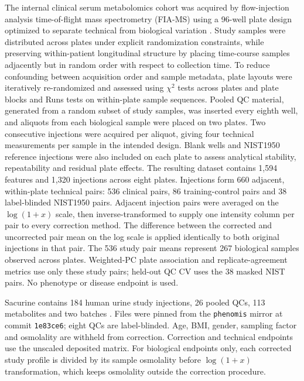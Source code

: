 \documentclass[namedate,webpdf,modern,large,nocrop]{oup-authoring-template}
\begin{document}
The internal clinical serum metabolomics cohort was acquired by flow-injection analysis time-of-flight mass spectrometry (FIA-MS) using a 96-well plate design optimized to separate technical from biological variation \citep{Fuhrer2011FIATOF}. Study samples were distributed across plates under explicit randomization constraints, while preserving within-patient longitudinal structure by placing time-course samples adjacently but in random order with respect to collection time. To reduce confounding between acquisition order and sample metadata, plate layouts were iteratively re-randomized and assessed using $\chi^2$ tests across plates and plate blocks and Runs tests on within-plate sample sequences. Pooled QC material, generated from a random subset of study samples, was inserted every eighth well, and aliquots from each biological sample were placed on two plates. Two consecutive injections were acquired per aliquot, giving four technical measurements per sample in the intended design. Blank wells and NIST1950 reference injections were also included on each plate to assess analytical stability, repeatability and residual plate effects. The resulting dataset contains 1,594 features and 1,320 injections across eight plates. Injections form 660 adjacent, within-plate technical pairs: 536 clinical pairs, 86 training-control pairs and 38 label-blinded NIST1950 pairs. Adjacent injection pairs were averaged on the \(\log(1+x)\) scale, then inverse-transformed to supply one intensity column per pair to every correction method. The difference between the corrected and uncorrected pair mean on the log scale is applied identically to both original injections in that pair. The 536 study pair means represent 267 biological samples observed across plates. Weighted-PC plate association and replicate-agreement metrics use only these study pairs; held-out QC CV uses the 38 masked NIST pairs. No phenotype or disease endpoint is used.

Sacurine contains 184 human urine study injections, 26 pooled QCs, 113 metabolites and two batches \citep{Thevenot2015Sacurine,Thevenot2018W4M00001}. Files were pinned from the \texttt{phenomis} mirror at commit \texttt{1e83ce6}; eight QCs are label-blinded. Age, BMI, gender, sampling factor and osmolality are withheld from correction. Correction and technical endpoints use the unscaled deposited matrix. For biological endpoints only, each corrected study profile is divided by its sample osmolality before $\log(1+x)$ transformation, which keeps osmolality outside the correction procedure.
\end{document}
